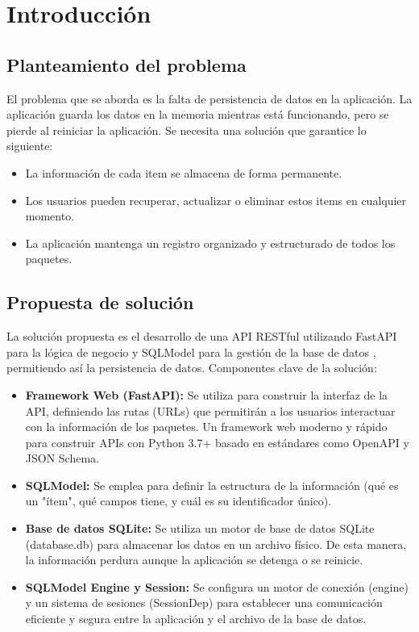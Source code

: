 \documentclass[12pt]{article}
\begin{document}
\newpage
\tableofcontents
\newpage

\section{Introducción}
\subsection*{Planteamiento del problema}
El problema que se aborda es la falta de persistencia de datos en la aplicación.
La aplicación guarda los datos en la memoria mientras está funcionando, pero se pierde al reiniciar la aplicación.
Se necesita una solución que garantice lo siguiente:
\begin{itemize}
    \item La información de cada item se almacena de forma permanente.
    \item Los usuarios pueden recuperar, actualizar o eliminar estos items en cualquier momento.
    \item La aplicación mantenga un registro organizado y estructurado de todos los paquetes.
\end{itemize}

\subsection*{Propuesta de solución}
La solución propuesta es el desarrollo de una API RESTful utilizando FastAPI para la lógica de negocio y SQLModel para la gestión de la base de datos , permitiendo así la persistencia de datos.
Componentes clave de la solución:
\begin{itemize}
    \item \textbf{Framework Web (FastAPI):} Se utiliza para construir la interfaz de la API, definiendo las rutas (URLs) que permitirán a los usuarios interactuar con la información de los paquetes. Un framework web moderno y rápido para construir APIs con Python 3.7+ basado en estándares como OpenAPI y JSON Schema.
    \item \textbf{SQLModel:} Se emplea para definir la estructura de la información (qué es un "ítem", qué campos tiene, y cuál es su identificador único).
    \item \textbf{Base de datos SQLite:} Se utiliza un motor de base de datos SQLite (database.db) para almacenar los datos en un archivo físico. De esta manera, la información perdura aunque la aplicación se detenga o se reinicie.
    \item \textbf{SQLModel Engine y Session:} Se configura un motor de conexión (engine) y un sistema de sesiones (SessionDep) para establecer una comunicación eficiente y segura entre la aplicación y el archivo de la base de datos.
\end{itemize}
\end{document}
